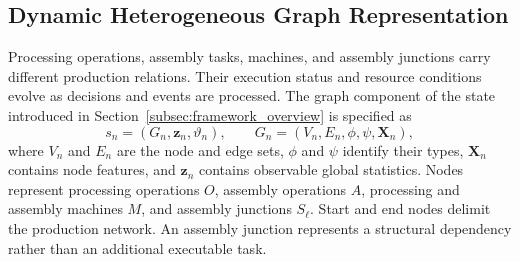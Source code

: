 \subsection{Dynamic Heterogeneous Graph Representation}
\label{subsec:temporal_graph}


Processing operations, assembly tasks, machines, and assembly junctions carry different production
relations. Their execution status and resource conditions evolve as decisions and events are processed.
The graph component of the state introduced in Section~\ref{subsec:framework_overview} is specified as
\begin{equation}
 s_n=(G_n,\boldsymbol{z}_n,\vartheta_n),\qquad
 G_n=(V_n,E_n,\phi,\psi,\boldsymbol{X}_n),
 \label{eq:temporal_graph}
\end{equation}
where $V_n$ and $E_n$ are the node and edge sets, $\phi$ and $\psi$ identify their types, $\boldsymbol{X}_n$ contains node features,
and $\boldsymbol{z}_n$ contains observable global statistics. Nodes represent processing operations $O$,
assembly operations $A$, processing and assembly machines $M$, and assembly junctions $S_\ell$.
Start and end nodes delimit the production network. An assembly junction represents a structural dependency
rather than an additional executable task.

